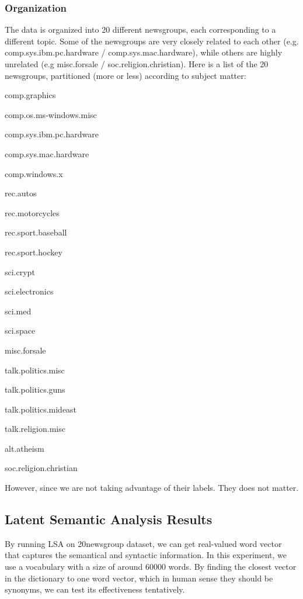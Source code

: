 \documentclass[a4paper]{book}
\begin{document}
    \subsubsection{Organization}
    The data is organized into 20 different newsgroups, each corresponding
    to a different topic. Some of the newsgroups are very closely related to
    each other (e.g. comp.sys.ibm.pc.hardware / comp.sys.mac.hardware),
    while others are highly unrelated (e.g misc.forsale /
    soc.religion.christian). Here is a list of the 20 newsgroups,
    partitioned (more or less) according to subject
    matter\cite{20newsgroups}:

    \begin{compactitem}
    \item comp.graphics
    \item comp.os.ms-windows.misc
    \item comp.sys.ibm.pc.hardware
    \item comp.sys.mac.hardware
    \item comp.windows.x
    \item rec.autos
    \item rec.motorcycles
    \item rec.sport.baseball
    \item rec.sport.hockey
    \item sci.crypt
    \item sci.electronics
    \item sci.med
    \item sci.space
    \item misc.forsale
    \item talk.politics.misc
    \item talk.politics.guns
    \item talk.politics.mideast
    \item talk.religion.misc
    \item alt.atheism
    \item soc.religion.christian
    \end{compactitem}

    However, since we are not taking advantage of their labels. They
    does not matter.

    \subsection{Latent Semantic Analysis Results}

    By running LSA on 20newsgroup dataset, we can get real-valued word
    vector that captures the semantical and syntactic information. In
    this experiment, we use a vocabulary with a size of around 60000
    words. By finding the closest vector in the dictionary to one word
    vector, which in human sense they should be synonyms, we can test
    its effectiveness tentatively.
\end{document}
